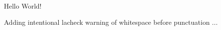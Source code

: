 \documentclass{article}
\begin{document}
Hello World!

Adding intentional lacheck warning of whitespace before punctuation ...

\end{document}
